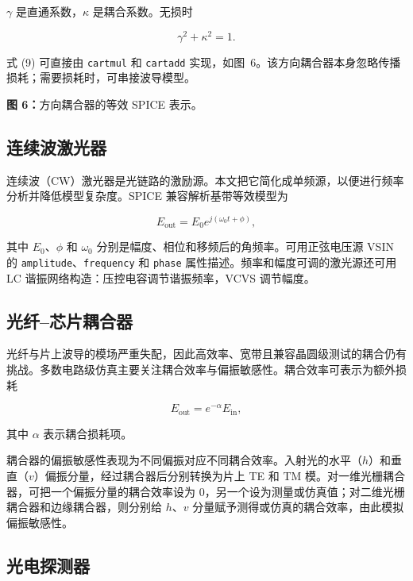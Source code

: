 \documentclass[11pt,a4paper]{ctexart}
\begin{document}
$\gamma$ 是直通系数，$\kappa$ 是耦合系数。无损时

\begin{equation}
\gamma^2+\kappa^2=1.
\tag{10}
\end{equation}

式 (9) 可直接由 \texttt{cartmul} 和 \texttt{cartadd} 实现，如图~6。该方向耦合器本身忽略传播损耗；需要损耗时，可串接波导模型。

\noindent\textbf{图 6：}方向耦合器的等效 SPICE 表示。

\subsection{连续波激光器}

连续波（CW）激光器是光链路的激励源。本文把它简化成单频源，以便进行频率分析并降低模型复杂度。SPICE 兼容解析基带等效模型为

\begin{equation}
E_{\mathrm{out}}=E_0e^{j(\omega_0t+\phi)},
\tag{11}
\end{equation}

其中 $E_0$、$\phi$ 和 $\omega_0$ 分别是幅度、相位和移频后的角频率。可用正弦电压源 VSIN 的 \texttt{amplitude}、\texttt{frequency} 和 \texttt{phase} 属性描述。频率和幅度可调的激光源还可用 LC 谐振网络构造：压控电容调节谐振频率，VCVS 调节幅度。

\subsection{光纤--芯片耦合器}

光纤与片上波导的模场严重失配，因此高效率、宽带且兼容晶圆级测试的耦合仍有挑战。多数电路级仿真主要关注耦合效率与偏振敏感性。耦合效率可表示为额外损耗

\begin{equation}
E_{\mathrm{out}}=e^{-\alpha}E_{\mathrm{in}},
\tag{12}
\end{equation}

其中 $\alpha$ 表示耦合损耗项。

耦合器的偏振敏感性表现为不同偏振对应不同耦合效率。入射光的水平（$h$）和垂直（$v$）偏振分量，经过耦合器后分别转换为片上 TE 和 TM 模。对一维光栅耦合器，可把一个偏振分量的耦合效率设为 0，另一个设为测量或仿真值；对二维光栅耦合器和边缘耦合器，则分别给 $h$、$v$ 分量赋予测得或仿真的耦合效率，由此模拟偏振敏感性。

\subsection{光电探测器}
\end{document}
